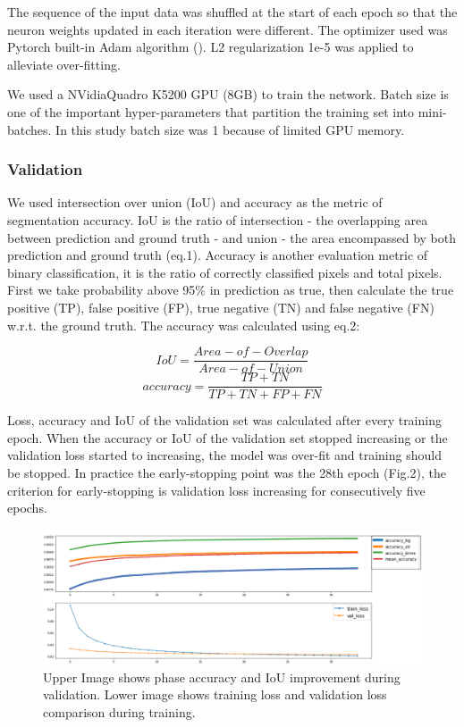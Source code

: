 \documentclass[draft,linenumbers]{agujournal2018}
\begin{document}
The sequence of the input data was shuffled at the start of each epoch so that the neuron weights updated in each iteration were different. The optimizer used was Pytorch built-in Adam algorithm (\citet{kingma2014adam}). L2 regularization 1e-5 was applied to alleviate over-fitting.

We used a NVidia\texttrademark Quadro K5200 GPU (8GB) to train the network. Batch size is one of the important hyper-parameters that partition the training set into mini-batches. In this study batch size was 1 because of limited GPU memory.

\subsubsection{Validation}
We used intersection over union (IoU) and accuracy as the metric of segmentation accuracy. IoU is the ratio of intersection - the overlapping area between prediction and ground truth - and union - the area encompassed by both prediction and ground truth (eq.1). Accuracy is another evaluation metric of binary classification, it is the ratio of correctly classified pixels and total pixels. First we take probability above 95\% in prediction as true, then calculate the true positive (TP), false positive (FP), true negative (TN) and false negative (FN) w.r.t. the ground truth. The accuracy was calculated using eq.2:

\begin{equation}
    IoU=\frac{Area-of-Overlap}{Area-of-Union}
\end{equation}
\begin{equation}
    accuracy=\frac{TP+TN}{TP+TN+FP+FN}
\end{equation}

Loss, accuracy and IoU of the validation set was calculated after every training epoch. When the accuracy or IoU of the validation set stopped increasing or the validation loss started to increasing, the model was over-fit and training should be stopped. In practice the early-stopping point was the 28th epoch (Fig.2), the criterion for early-stopping is validation loss increasing for consecutively five epochs.

\begin{figure}[h]
 \centering
 \includegraphics[width=33pc]{imgs/training_result_23oct.png}
 \caption{Upper Image shows phase accuracy and IoU improvement during validation. Lower image shows training loss and validation loss comparison during training.}
 \label{fig2}
 \end{figure}
\end{document}
